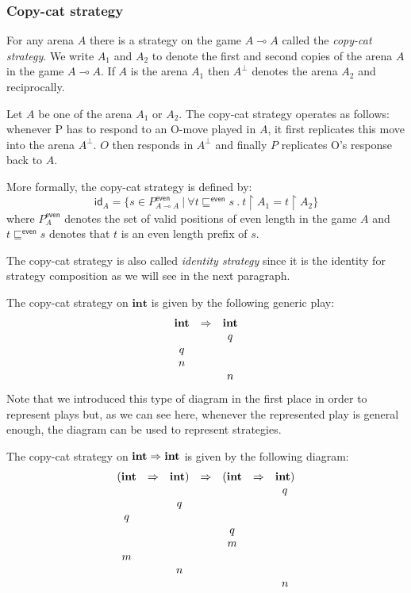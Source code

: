 \subsubsection{Copy-cat strategy}

For any arena $A$ there is a strategy on the game $A \multimap A$
called the \emph{copy-cat strategy}. We write $A_1$ and $A_2$ to
denote the first and second copies of the arena $A$ in the game $A
\multimap A$. If $A$ is the arena $A_1$ then $A^\perp$ denotes the
arena $A_2$ and reciprocally.

Let $A$ be one of the arena $A_1$ or $A_2$. The copy-cat strategy
operates as follows: whenever P has to respond to an O-move played
in $A$, it first replicates this move into the arena $A^{\perp}$.
$O$ then responds in $A^{\perp}$ and finally $P$ replicates O's
response back to $A$.


More formally, the copy-cat strategy is defined by:
$$ \textsf{id}_A = \{ s \in P^{\textsf{even}}_{A \multimap A} \ | \ \forall t \sqsubseteq^{\textsf{even}} s\ .\ t \upharpoonright A_1 = t \upharpoonright A_2 \}$$
where $P^{\textsf{even}}_A$ denotes the set of valid positions of
even length in the game $A$ and $t \sqsubseteq^{\textsf{even}} s$
denotes that $t$ is an even length prefix of $s$.

The copy-cat strategy is also called \emph{identity strategy} since
it is the identity for strategy composition as we will see in the
next paragraph.

\begin{exmp} The copy-cat strategy on $\textbf{int}$ is given by the following generic play:
$$\begin{array}{ccc}
\textbf{int} & \Rightarrow & \textbf{int} \\
&& q\\
q \\
n \\
&& n
\end{array}
$$
Note that we introduced this type of diagram in the first place in
order to represent plays but, as we can see here, whenever the
represented play is general enough, the diagram can be used to
represent strategies.

The copy-cat strategy on $\textbf{int} \Rightarrow \textbf{int}$ is given
by the following diagram:
$$\begin{array}{ccccccc}
(\textbf{int} & \Rightarrow & \textbf{int}) & \Rightarrow & (\textbf{int} & \Rightarrow & \textbf{int}) \\
&&&& && q\\
&& q\\
q \\
&&&& q \\
&&&& m \\
m\\
&& n \\
&&&& && n
\end{array}$$
\end{exmp}

